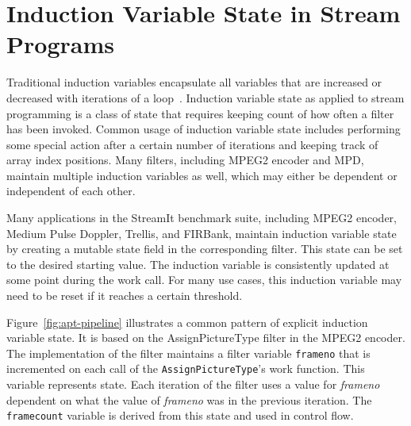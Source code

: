 \section{Induction Variable State in Stream Programs}
\label{sec:inductionstate}

  




Traditional induction variables encapsulate all variables that are
increased or decreased with iterations of a loop~\cite{Aho:1986, Fischer:2009}.  Induction variable
state as applied to stream programming is a class of state that
requires keeping count of how often a filter has been invoked.  Common
usage of induction variable state includes performing some special
action after a certain number of iterations and keeping track of array
index positions.  Many filters, including MPEG2 encoder and MPD, maintain multiple induction variables
as well, which may either be dependent or independent of each other.

Many applications in the StreamIt benchmark suite, including MPEG2 encoder,
Medium Pulse Doppler, Trellis, and FIRBank, maintain induction variable state 
by creating a mutable state field in the corresponding filter.  This
state can be set to the desired starting value.  The induction
variable is consistently updated at some point during the work call.
For many use cases, this induction variable may need to be reset if it
reaches a certain threshold. 

Figure~\ref{fig:apt-pipeline} illustrates a common pattern of explicit
induction variable state.  It is based on the AssignPictureType filter in 
the MPEG2 encoder. The implementation of the filter maintains
a filter variable {\tt frameno} that is incremented on each call of
the {\tt AssignPictureType}'s work function.  This variable
represents state.  Each iteration of the 
filter uses a value for {\it frameno} dependent on what the value of
{\it frameno} was in the previous iteration.  The {\tt framecount} variable is derived
from this state and used in control flow.

